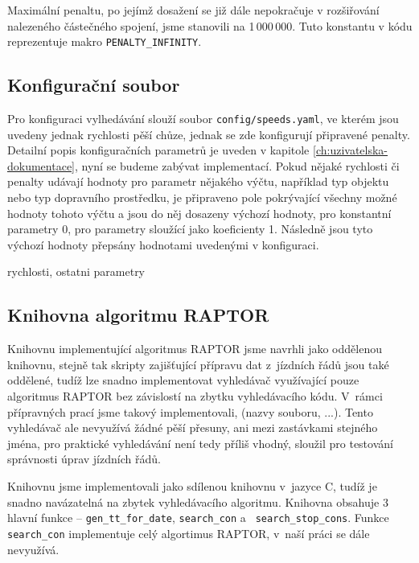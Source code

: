 Maximální penaltu, po jejímž dosažení se již dále nepokračuje v rozšiřování
nalezeného částečného spojení, jsme stanovili na 1\,000\,000. Tuto konstantu v
kódu reprezentuje makro {\tt PENALTY\_INFINITY}.

\subsection{Konfigurační soubor}
Pro konfiguraci vylhedávání slouží soubor {\tt config/speeds.yaml}, ve kterém
jsou uvedeny jednak rychlosti pěší chůze, jednak se zde konfigurují připravené
penalty. Detailní popis konfiguračních parametrů je uveden v kapitole
\ref{ch:uzivatelska-dokumentace}, nyní se budeme zabývat implementací. Pokud
nějaké rychlosti či penalty udávají hodnoty pro parametr nějakého výčtu,
například typ objektu nebo typ dopravního prostředku, je připraveno pole
pokrývající všechny možné hodnoty tohoto výčtu a jsou do něj dosazeny výchozí
hodnoty, pro konstantní parametry 0, pro parametry sloužící jako koeficienty 1.
Následně jsou tyto výchozí hodnoty přepsány hodnotami uvedenými v konfiguraci.

\TODO rychlosti, ostatni parametry

\subsection{Knihovna algoritmu RAPTOR}
Knihovnu implementující algoritmus RAPTOR jsme navrhli jako oddělenou knihovnu,
stejně tak skripty zajišťující přípravu dat z~jízdních řádů jsou také oddělené,
tudíž lze snadno implementovat vyhledávač využívající pouze algoritmus RAPTOR
bez závislostí na zbytku vyhledávacího kódu. V~rámci přípravných prací jsme
takový implementovali, (\TODO nazvy souboru, ...). Tento vyhledávač ale
nevyužívá žádné pěší přesuny, ani mezi zastávkami stejného jména, pro praktické
vyhledávání není tedy příliš vhodný, sloužil pro testování správnosti úprav
jízdních řádů.

Knihovnu jsme implementovali jako sdílenou knihovnu v~jazyce C, tudíž je snadno
navázatelná na zbytek vyhledávacího algoritmu. Knihovna obsahuje 3 hlavní
funkce -- {\tt gen\_tt\_for\_date}, {\tt search\_con} a {\tt
search\_stop\_cons}. Funkce {\tt search\_con} implementuje celý algortimus
RAPTOR, v~naší práci se dále nevyužívá.

